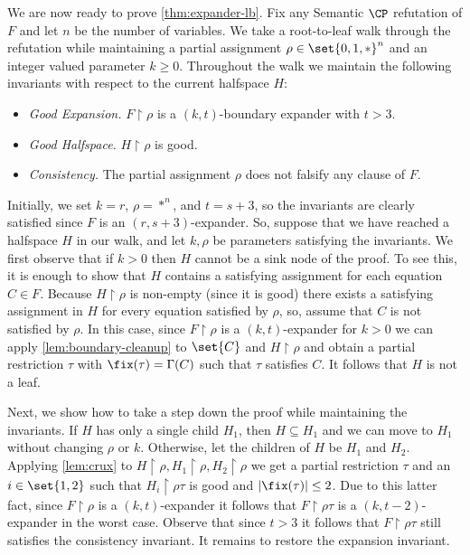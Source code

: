 	We are now ready to prove \autoref{thm:expander-lb}.
	Fix any Semantic $\CP$ refutation of $F$ and let $n$ be the number of variables.
	We take a root-to-leaf walk through the refutation while maintaining a partial assignment $\rho \in \set{0,1,*}^n$ and an integer valued parameter $k \geq 0$.
	Throughout the walk we maintain the following invariants with respect to the current halfspace $H$: 
	\begin{itemize}
		\item[--] \emph{Good Expansion.} $F \restriction \rho$ is a $(k, t)$-boundary expander with $t > 3$.
		\item[--] \emph{Good Halfspace.} $H \restriction \rho$ is good.
		\item[--] \emph{Consistency.} The partial assignment $\rho$ does not falsify any clause of $F$.
	\end{itemize}
	
	Initially, we set $k = r$, $\rho = *^n$, and $t=s+3$, so the invariants are clearly satisfied since $F$ is an $(r, s+3)$-expander.
	So, suppose that we have reached a halfspace $H$ in our walk, and let $k, \rho$ be parameters satisfying the invariants.
	We first observe that if $k > 0$ then $H$ cannot be a sink node of the proof.
	To see this, it is enough to show that $H$ contains a satisfying assignment for each equation $C \in F$. 
	Because $H \restriction \rho$ is non-empty (since it is good) there exists a satisfying assignment in $H$ for every equation satisfied by $\rho$, so, 	assume that $C$ is not satisfied by $\rho$. 
	In this case, since $F \restriction \rho$ is a $(k, t)$-expander for $k>0$ we can apply \autoref{lem:boundary-cleanup} to $\set{C}$ and $H \restriction \rho$ and obtain a partial restriction $\tau$ with $\fix(\tau) = \Gamma(C)$ such that $\tau$ satisfies $C$.
	It follows that $H$ is not a leaf.

	Next, we show how to take a step down the proof while maintaining the invariants. 
	If $H$ has only a single child $H_1$, then $H \subseteq H_1$ and we can move to $H_1$ without changing $\rho$ or $k$.
	Otherwise, let the children of $H$ be $H_1$ and $H_2$. 
	Applying \autoref{lem:crux} to $H \restriction \rho, H_1 \restriction \rho, H_2 \restriction \rho$ we get a partial restriction $\tau$ and an $i \in \set{1,2}$ such that $H_i \restriction \rho\tau$ is good and $|\fix(\tau)| \leq 2$.
	Due to this latter fact, since $F \restriction \rho$ is a $(k, t)$-expander it follows that $F \restriction \rho\tau$ is a $(k, t-2)$-expander in the worst case.
	Observe that since $t > 3$ it follows that $F \restriction \rho\tau$ still satisfies the consistency invariant.
	It remains to restore the expansion invariant.

